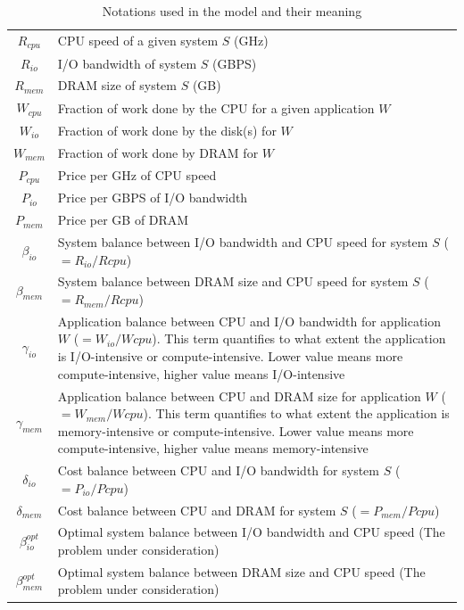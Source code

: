 \documentclass[journal]{IEEEtran}
\begin{document}
\begin{table}[!t]
\caption{Notations used in the model and their meaning}
\label{tab:Notation}
\centering
\begin{tabular}{|c|p{7cm}|}
\hline
$R_{cpu}$ & CPU speed of a given system $S$ (GHz)\\
$R_{io}$ &  I/O bandwidth of system $S$ (GBPS)\\
$R_{mem}$ & DRAM size of system $S$ (GB)\\
\hline
$W_{cpu}$ & Fraction of work done by the CPU for a given application $W$\\
$W_{io}$ & Fraction of work done by the disk(s) for $W$\\
$W_{mem}$ & Fraction of work done by DRAM for $W$\\
\hline
$P_{cpu}$ & Price per GHz of CPU speed\\
$P_{io}$ & Price per GBPS of I/O bandwidth\\
$P_{mem}$ & Price per GB of DRAM\\
\hline
\hline
$\beta_{io}$ & System balance between I/O bandwidth and CPU speed for system $S$ ($= R_{io}/R{cpu}$)\\
$\beta_{mem}$ & System balance between DRAM size and CPU speed for system $S$ ($= R_{mem}/R{cpu}$)\\
\hline
$\gamma_{io}$ & Application balance between CPU and I/O bandwidth for application $W$ ($= W_{io}/W{cpu}$). This term quantifies to what extent the application is I/O-intensive or compute-intensive. Lower value means more compute-intensive, higher value means I/O-intensive \\
$\gamma_{mem}$ & Application balance between CPU and DRAM size for application $W$ ($= W_{mem}/W{cpu}$). This term quantifies to what extent the application is memory-intensive or compute-intensive. Lower value means more compute-intensive, higher value means memory-intensive \\
\hline
$\delta_{io}$ & Cost balance between CPU and I/O bandwidth for system $S$ ($= P_{io}/P{cpu}$)\\
$\delta_{mem}$ & Cost balance between CPU and DRAM for system $S$ ($= P_{mem}/P{cpu}$)\\
\hline
\hline
$\beta_{io}^{opt}$ & Optimal system balance between I/O bandwidth and CPU speed (The problem under consideration)\\
$\beta_{mem}^{opt}$ & Optimal system balance between DRAM size and CPU speed (The problem under consideration)\\
\hline
\end{tabular}
\end{table}
\end{document}
